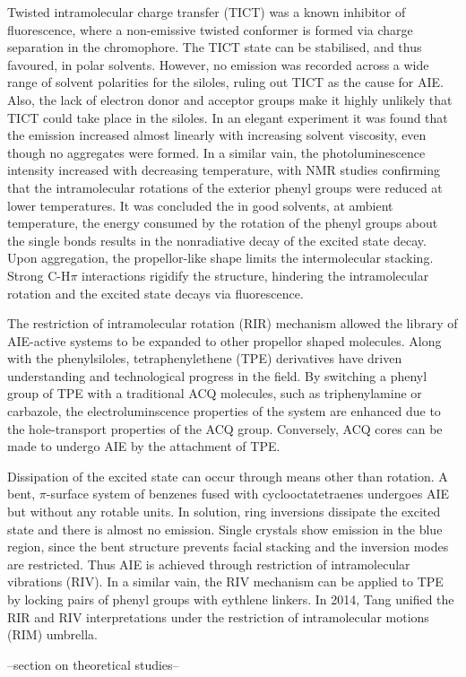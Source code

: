 Twisted intramolecular charge transfer (TICT) was a known inhibitor of fluorescence, where a non-emissive twisted conformer is formed via charge separation in the chromophore. The TICT state can be stabilised, and thus favoured, in polar solvents. However, no emission was recorded across a wide range of solvent polarities for the siloles, ruling out TICT as the cause for AIE. Also, the lack of electron donor and acceptor groups make it highly unlikely that TICT could take place in the siloles. In an elegant experiment it was found that the emission increased almost linearly with increasing solvent viscosity, even though no aggregates were formed. In a similar vain, the photoluminescence intensity increased with decreasing temperature, with NMR studies confirming that the intramolecular rotations of the exterior phenyl groups were reduced at lower temperatures. It was concluded the in good solvents, at ambient temperature, the energy consumed by the rotation of the phenyl groups about the single bonds results in the nonradiative decay of the excited state decay. Upon aggregation, the propellor-like shape limits the intermolecular stacking. Strong C-H\textperiodcentered\textperiodcentered\textperiodcentered$\pi$ interactions rigidify the structure, hindering the intramolecular rotation and the excited state decays via fluorescence.

The restriction of intramolecular rotation (RIR) mechanism allowed the library of AIE-active systems to be expanded to other propellor shaped molecules.  Along with the phenylsiloles, tetraphenylethene (TPE)  derivatives have driven understanding and technological progress in the field.\cite{Hong2009,Wang2010a,Hong2011,Mei2014,Hu2014,Mei2015} By switching a phenyl group of TPE with a traditional ACQ molecules, such as triphenylamine or carbazole, the electroluminscence properties of the system are enhanced due to the hole-transport properties of the ACQ group.\cite{Chan2014} Conversely, ACQ cores can be made to undergo AIE by the attachment of TPE.\cite{Yuan2010a} 

Dissipation of the excited state can occur through means other than rotation. A bent, $\pi$-surface system of benzenes fused with cyclooctatetraenes undergoes AIE but without any rotable units.\cite{Nishiuchi2013} In solution, ring inversions dissipate the excited state and there is almost no emission. Single crystals show emission in the blue region, since the bent structure prevents facial stacking and the inversion modes are restricted. Thus AIE is achieved through restriction of intramolecular vibrations (RIV). In a similar vain, the RIV mechanism can be applied to TPE by locking pairs of phenyl groups with eythlene linkers. In 2014, Tang unified the RIR and RIV interpretations under the restriction of intramolecular motions (RIM) umbrella.\cite{Leung2014}



--section on theoretical studies--
